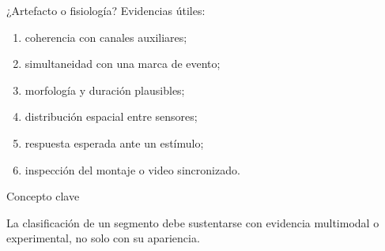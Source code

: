 \documentclass[
  10pt,
  ignorenonframetext,
  aspectratio=169,
  spanish,
]{beamer}
\providecommand{\tightlist}{%
  \setlength{\itemsep}{0pt}\setlength{\parskip}{0pt}}
\begin{document}
\begin{frame}{¿Artefacto o fisiología?}
\label{d1-023}
Evidencias útiles:

\begin{enumerate}
\tightlist
\item
  coherencia con canales auxiliares;
\item
  simultaneidad con una marca de evento;
\item
  morfología y duración plausibles;
\item
  distribución espacial entre sensores;
\item
  respuesta esperada ante un estímulo;
\item
  inspección del montaje o video sincronizado.
\end{enumerate}

\begin{block}{Concepto clave}

La clasificación de un segmento debe sustentarse con evidencia
multimodal o experimental, no solo con su apariencia.

\end{block}

\end{frame}
\end{document}
